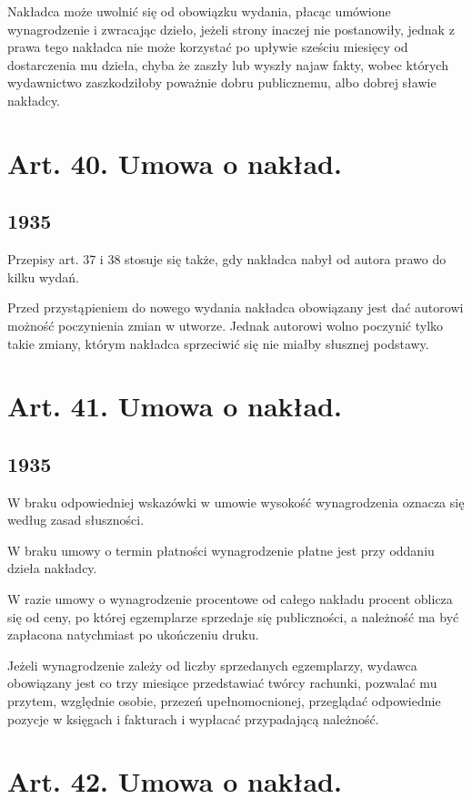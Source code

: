 \documentclass[withmarginpar]{book}
\begin{document}
Nakładca może uwolnić się od obowiązku wydania, płacąc umówione
wynagrodzenie i zwracając dzieło, jeżeli strony inaczej nie
postanowiły, jednak z prawa tego nakładca nie może korzystać po
upływie sześciu miesięcy od dostarczenia mu dzieła, chyba że zaszły
lub wyszły najaw fakty, wobec których wydawnictwo zaszkodziłoby
poważnie dobru publicznemu, albo dobrej sławie nakładcy.

\section{Art. 40. Umowa o nakład.}
\label{sec:art.-40}
\subsection{1935}
\label{sec:art.-40-1}

Przepisy art. 37 i 38 stosuje się także, gdy nakładca nabył od autora
prawo do kilku wydań.

Przed przystąpieniem do nowego wydania nakładca obowiązany jest dać
autorowi możność poczynienia zmian w utworze. Jednak autorowi wolno
poczynić tylko takie zmiany, którym nakładca sprzeciwić się nie miałby
słusznej podstawy.

\section{Art. 41. Umowa o nakład.}
\label{sec:art.-41}
\subsection{1935}
\label{sec:art.-41-1}

W braku odpowiedniej wskazówki w umowie wysokość wynagrodzenia oznacza
się według zasad słuszności.

W braku umowy o termin płatności wynagrodzenie płatne jest przy
oddaniu dzieła nakładcy.

W razie umowy o wynagrodzenie procentowe od całego nakładu procent
oblicza się od ceny, po której egzemplarze sprzedaje się publiczności,
a należność ma być zapłacona natychmiast po ukończeniu druku.

Jeżeli wynagrodzenie zależy od liczby sprzedanych egzemplarzy, wydawca
obowiązany jest co trzy miesiące przedstawiać twórcy rachunki,
pozwalać mu przytem, względnie osobie, przezeń upełnomocnionej,
przeglądać odpowiednie pozycje w księgach i fakturach i wypłacać
przypadającą należność.

\section{Art. 42. Umowa o nakład.}
\label{sec:art.-42}
\end{document}
